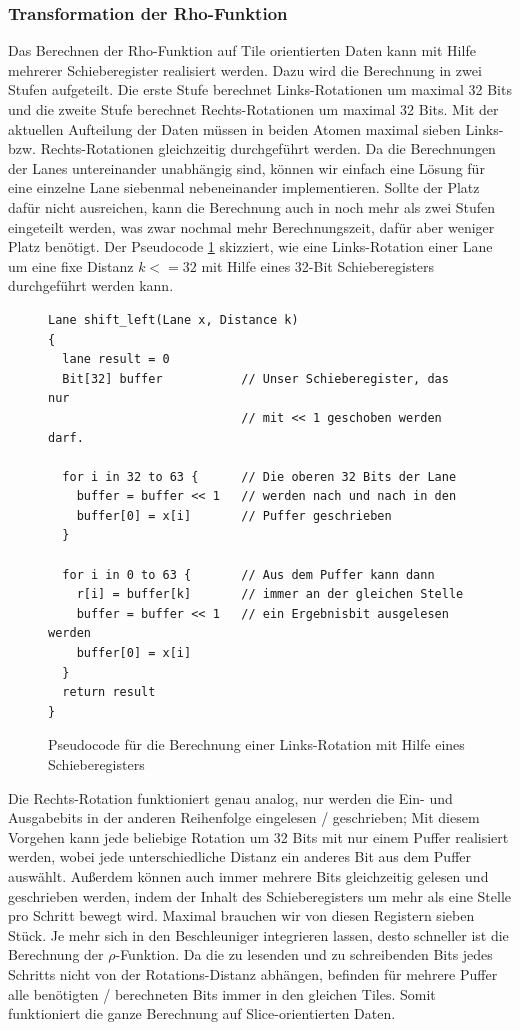 \subsubsection{Transformation der Rho-Funktion}
\label{cha:iteration_2_rho_transformation}
Das Berechnen der Rho-Funktion auf Tile orientierten Daten kann mit Hilfe mehrerer Schieberegister realisiert werden.
Dazu wird die Berechnung in zwei Stufen aufgeteilt. Die erste Stufe berechnet Links-Rotationen um maximal 32 Bits
und die zweite Stufe berechnet Rechts-Rotationen um maximal 32 Bits. Mit der aktuellen Aufteilung der Daten müssen in beiden Atomen
maximal sieben Links- bzw. Rechts-Rotationen gleichzeitig durchgeführt werden. Da die Berechnungen der Lanes untereinander unabhängig sind,
können wir einfach eine Lösung für eine einzelne Lane siebenmal nebeneinander implementieren. Sollte der Platz dafür nicht ausreichen,
kann die Berechnung auch in noch mehr als zwei Stufen eingeteilt werden, was zwar nochmal mehr Berechnungszeit, dafür aber weniger Platz benötigt.
Der Pseudocode \ref{fig:iteration_2_leftshift} skizziert, wie eine Links-Rotation einer Lane um eine fixe Distanz $k <= 32$ mit Hilfe eines 32-Bit Schieberegisters
durchgeführt werden kann.
\begin{figure}
\lstset{language=C}
\begin{lstlisting}[label={lst:shift_left}]
Lane shift_left(Lane x, Distance k)
{
  lane result = 0
  Bit[32] buffer           // Unser Schieberegister, das nur
						   // mit << 1 geschoben werden darf.
  
  for i in 32 to 63 {      // Die oberen 32 Bits der Lane
	buffer = buffer << 1   // werden nach und nach in den
	buffer[0] = x[i]       // Puffer geschrieben
  }
  
  for i in 0 to 63 {       // Aus dem Puffer kann dann
	r[i] = buffer[k]       // immer an der gleichen Stelle
	buffer = buffer << 1   // ein Ergebnisbit ausgelesen werden
	buffer[0] = x[i]
  }
  return result
}
\end{lstlisting}
\caption{Pseudocode für die Berechnung einer Links-Rotation mit Hilfe eines Schieberegisters}
\label{fig:iteration_2_leftshift}
\end{figure}
Die Rechts-Rotation funktioniert genau analog, nur werden die Ein- und Ausgabebits in der anderen Reihenfolge eingelesen / geschrieben;
Mit diesem Vorgehen kann jede beliebige Rotation um 32 Bits mit nur einem Puffer realisiert werden, wobei jede unterschiedliche
Distanz ein anderes Bit aus dem Puffer auswählt. Außerdem können auch immer mehrere Bits gleichzeitig gelesen und geschrieben werden,
indem der Inhalt des Schieberegisters um mehr als eine Stelle pro Schritt bewegt wird.
Maximal brauchen wir von diesen Registern sieben Stück. Je mehr sich in den Beschleuniger integrieren lassen,
desto schneller ist die Berechnung der $\rho$-Funktion. Da die zu lesenden und zu schreibenden Bits jedes Schritts nicht von der Rotations-Distanz
abhängen, befinden für mehrere Puffer alle benötigten / berechneten Bits immer in den gleichen Tiles.
Somit funktioniert die ganze Berechnung auf Slice-orientierten Daten.

